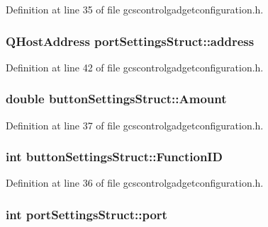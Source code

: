 \-Definition at line 35 of file gcscontrolgadgetconfiguration.\-h.

\hypertarget{group___g_c_s_control_gadget_plugin_ga4a1de1267a23f01dad6562a23ddf70f8}{
\subsubsection[{address}]{\setlength{\rightskip}{0pt plus 5cm}\-Q\-Host\-Address {\bf port\-Settings\-Struct\-::address}}}\label{group___g_c_s_control_gadget_plugin_ga4a1de1267a23f01dad6562a23ddf70f8}


\-Definition at line 42 of file gcscontrolgadgetconfiguration.\-h.

\hypertarget{group___g_c_s_control_gadget_plugin_gaaa14aa6512e6e46a95fcfd01c675cbf7}{
\subsubsection[{\-Amount}]{\setlength{\rightskip}{0pt plus 5cm}double {\bf button\-Settings\-Struct\-::\-Amount}}}\label{group___g_c_s_control_gadget_plugin_gaaa14aa6512e6e46a95fcfd01c675cbf7}


\-Definition at line 37 of file gcscontrolgadgetconfiguration.\-h.

\hypertarget{group___g_c_s_control_gadget_plugin_ga0cf7694f3cc910d158e54851d077dd22}{
\subsubsection[{\-Function\-I\-D}]{\setlength{\rightskip}{0pt plus 5cm}int {\bf button\-Settings\-Struct\-::\-Function\-I\-D}}}\label{group___g_c_s_control_gadget_plugin_ga0cf7694f3cc910d158e54851d077dd22}


\-Definition at line 36 of file gcscontrolgadgetconfiguration.\-h.

\hypertarget{group___g_c_s_control_gadget_plugin_ga0f8fc6e0cdd5eac4d00a2b169f94c7a3}{
\subsubsection[{port}]{\setlength{\rightskip}{0pt plus 5cm}int {\bf port\-Settings\-Struct\-::port}}}\label{group___g_c_s_control_gadget_plugin_ga0f8fc6e0cdd5eac4d00a2b169f94c7a3}


